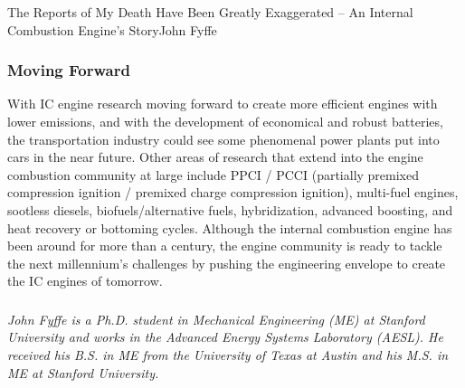 \documentclass{papertex}
\begin{document}
\begin{news}{2}{The Reports of My Death Have Been Greatly Exaggerated -- An Internal Combustion Engine’s Story}{John Fyffe}{}{}
\subsubsection*{Moving Forward}

With IC engine research moving forward to create more efficient engines with 
lower emissions, and with the development of economical and robust batteries, 
the transportation industry could see some phenomenal power plants put into 
cars in the near future.  Other areas of research that extend into the engine 
combustion community at large include PPCI / PCCI (partially premixed 
compression ignition / premixed charge compression ignition), multi-fuel 
engines, sootless diesels, biofuels/alternative fuels, hybridization, advanced 
boosting, and heat recovery or bottoming cycles.  Although the internal 
combustion engine has been around for more than a century, the engine 
community is ready to tackle the next millennium’s challenges by pushing the 
engineering envelope to create the IC engines of tomorrow.

\subsubsection*{}

\emph{John Fyffe is a Ph.D. student in Mechanical Engineering (ME) at Stanford 
University and works in the Advanced Energy Systems Laboratory (AESL). He 
received his B.S. in ME from the University of Texas at Austin and his M.S. 
in ME at Stanford University.}

\end{news}
\end{document}
